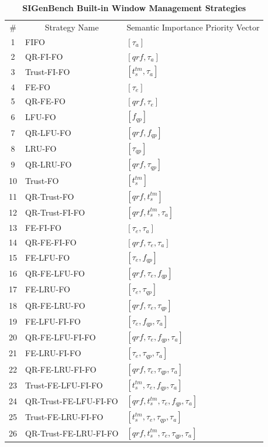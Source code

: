 \begin{table}[!htbp]
	\centering
    \caption{\textbf{SIGenBench Built-in Window Management Strategies}}
    \label{tab:6-26s}
    \begin{tabular}{|c||l|l|} \hline
         \# & \multicolumn{1}{c|}{Strategy Name} & \multicolumn{1}{c|}{Semantic Importance Priority Vector} \\ \hhline{|=#=|=|}
         1 & FIFO & $[\tau_{a}]$ \\ \hline
         2 & QR-FI-FO & $[qrf, \tau_{a}]$ \\ \hline 
         3 & Trust-FI-FO & $[t^{tm}_{s}, \tau_{a}]$ \\ \hline
         4 & FE-FO & $[\tau_{e}]$ \\ \hline
         5 & QR-FE-FO & $[qrf, \tau_{e}]$ \\ \hline
         6 & LFU-FO & $[f_{qp}]$ \\ \hline
         7 & QR-LFU-FO & $[qrf, f_{qp}]$ \\ \hline
         8 & LRU-FO & $[\tau_{qp}]$ \\ \hline
         9 & QR-LRU-FO & $[qrf, \tau_{qp}]$ \\ \hline
         10 & Trust-FO & $[t^{tm}_{s}]$ \\ \hline 
         11 & QR-Trust-FO & $[qrf, t^{tm}_{s}]$ \\ \hline 
         12 & QR-Trust-FI-FO & $[qrf, t^{tm}_{s}, \tau_{a}]$ \\ \hline
         13 & FE-FI-FO & $[\tau_{e}, \tau_{a}]$ \\ \hline
         14 & QR-FE-FI-FO & $[qrf, \tau_{e}, \tau_{a}]$ \\ \hline
         15 & FE-LFU-FO & $[\tau_{e}, f_{qp}]$ \\ \hline
         16 & QR-FE-LFU-FO & $[qrf, \tau_{e}, f_{qp}]$ \\ \hline
         17 & FE-LRU-FO & $[\tau_{e}, \tau_{qp}]$ \\ \hline
         18 & QR-FE-LRU-FO & $[qrf, \tau_{e}, \tau_{qp}]$ \\ \hline
         19 & FE-LFU-FI-FO & $[\tau_{e}, f_{qp}, \tau_{a}]$ \\ \hline
         20 & QR-FE-LFU-FI-FO & $[qrf, \tau_{e}, f_{qp}, \tau_{a}]$ \\ \hline
         21 & FE-LRU-FI-FO & $[\tau_{e}, \tau_{qp}, \tau_{a}]$ \\ \hline
         22 & QR-FE-LRU-FI-FO & $[qrf, \tau_{e}, \tau_{qp}, \tau_{a}]$ \\ \hline
         23 & Trust-FE-LFU-FI-FO & $[t^{tm}_{s}, \tau_{e}, f_{qp}, \tau_{a}]$ \\ \hline
         24 & QR-Trust-FE-LFU-FI-FO & $[qrf, t^{tm}_{s}, \tau_{e}, f_{qp}, \tau_{a}]$ \\ \hline
         25 & Trust-FE-LRU-FI-FO & $[t^{tm}_{s}, \tau_{e}, \tau_{qp}, \tau_{a}]$ \\ \hline
         26 & QR-Trust-FE-LRU-FI-FO & $[qrf, t^{tm}_{s}, \tau_{e}, \tau_{qp}, \tau_{a}]$ \\ \hline    
    \end{tabular}
\end{table}
